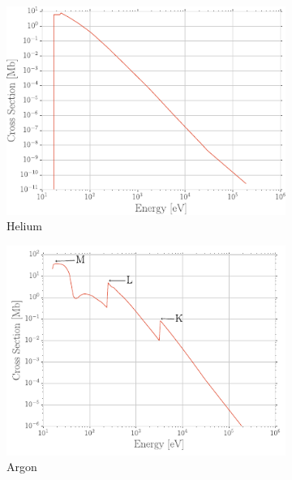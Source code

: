 	\begin{figure}[H]
		\begin{subfigure}{0.5\linewidth}
			\centering
			\includegraphics[width = \linewidth]{fig/chapt3/HEED-Helium.pdf}
			\caption{\label{fig:PAIR:A} Helium}
		\end{subfigure}
		\begin{subfigure}{0.5\linewidth}
			\centering
			\includegraphics[width = \linewidth]{fig/chapt3/HEED-Argon.pdf}
			\caption{\label{fig:PAIR:B} Argon}
		\end{subfigure}
		\begin{subfigure}{0.5\linewidth}
			\centering

\end{subfigure}
\end{figure}

